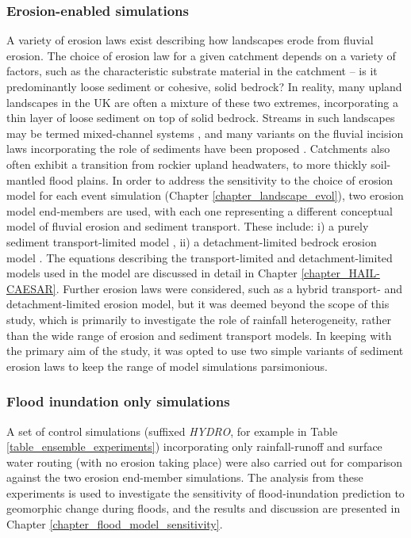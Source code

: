 \subsubsection{Erosion-enabled simulations}
A variety of erosion laws exist describing how landscapes erode from fluvial erosion. The choice of erosion law for a given catchment depends on a variety of factors, such as the characteristic substrate material in the catchment -- is it predominantly loose sediment or cohesive, solid bedrock? In reality, many upland landscapes in the UK are often a mixture of these two extremes, incorporating a thin layer of loose sediment on top of solid bedrock. Streams in such landscapes may be termed mixed-channel systems \citep{howard1998long}, and many variants on the fluvial incision laws incorporating the role of sediments have been proposed \citep{Lague2005,sklar2006role}. Catchments also often exhibit a transition from rockier upland headwaters, to more thickly soil-mantled flood plains. In order to address the sensitivity to the choice of erosion model for each event simulation (Chapter \ref{chapter_landscape_evol}), two erosion model end-members are used, with each one representing a different conceptual model of fluvial erosion and sediment transport. These include: i) a purely sediment transport-limited model \citep{wilcock2003surface}, ii) a detachment-limited bedrock erosion model \citep{howard1983channel,stock1999geologic,whipple1999dynamics}. The equations describing the transport-limited and detachment-limited models used in the model are discussed in detail in Chapter \ref{chapter_HAIL-CAESAR}. Further erosion laws were considered, such as a hybrid transport- and detachment-limited erosion model, but it was deemed beyond the scope of this study, which is primarily to investigate the role of rainfall heterogeneity, rather than the wide range of erosion and sediment transport models. In keeping with the primary aim of the study, it was opted to use two simple variants of sediment erosion laws to keep the range of model simulations parsimonious. 

\subsubsection{Flood inundation only simulations}
A set of control simulations (suffixed \textit{HYDRO}, for example in Table \ref{table_ensemble_experiments}) incorporating only rainfall-runoff and surface water routing (with no erosion taking place) were also carried out for comparison against the two erosion end-member simulations. The analysis from these experiments is used to investigate the sensitivity of flood-inundation prediction to geomorphic change during floods, and the results and discussion are presented in Chapter \ref{chapter_flood_model_sensitivity}.

